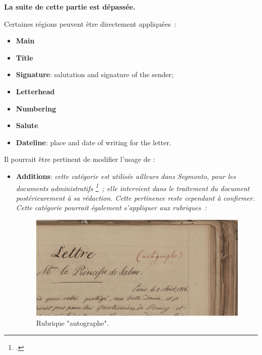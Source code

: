\documentclass[a4paper,12pt,twoside]{book}
\newcommand{\langue}[1]{\emph{#1}}
\begin{document}
			\textbf{La suite de cette partie est dépassée.}
	        
	        Certaines régions peuvent être directement appliquées :
			\begin{itemize}
				\item \textbf{Main}
				\item \textbf{Title}
				\item \textbf{Signature}: salutation and signature of the sender;
				\item \textbf{Letterhead}
				\item \textbf{Numbering}
				\item \textbf{Salute}
				\item \textbf{Dateline}: place and date of writing for the letter.
			\end{itemize}
			
			Il pourrait être pertinent de modifier l'usage de :
			\begin{itemize}
				\item \textbf{Additions}: \langue{cette catégorie est utilisée ailleurs dans \gls{Segmonto}, pour les documents administratifs			\selectlanguage{french}\footcite{chagueDocumentsAdministratifsXIXe2021}~; elle intervient dans le traitement du document postérieurement à sa rédaction. Cette pertinence reste cependant à confirmer. Cette catégorie pourrait également s'appliquer aux rubriques~:}
				\begin{figure}[!h]
					\centering
					\includegraphics{img/CdS02_Konv002-02_0064_detail.jpg}
					\caption{Rubrique "autographe".}
					\label{autographe}%
				\end{figure}
			\end{itemize}
\end{document}
